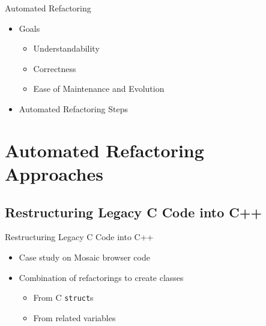 \documentclass{beamer}
\begin{document}
\begin{frame}{Automated Refactoring}
  \begin{itemize}
    \item Goals
    \begin{itemize}
      \item Understandability
      \item Correctness
      \item Ease of Maintenance and Evolution
    \end{itemize}
  \end{itemize}
  \pause
  \begin{itemize}
    \item Automated Refactoring Steps
    
  \end{itemize}
\end{frame}

\section{Automated Refactoring Approaches}

\subsection{Restructuring Legacy C Code into C++}

\begin{frame}{Restructuring Legacy C Code into C++}
  
  \begin{itemize}
    \item Case study on Mosaic browser code
    \pause
    \item Combination of refactorings to create classes
    \begin{itemize}
      \item From C \texttt{struct}s
      \item From related variables
    \end{itemize}
  \end{itemize}
\end{frame}
\end{document}
